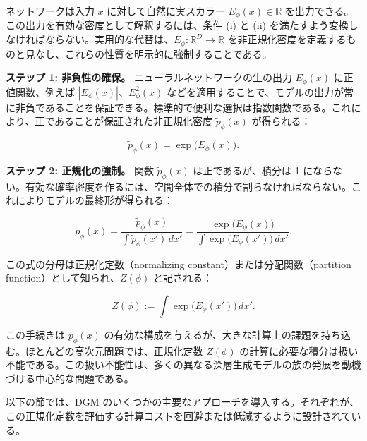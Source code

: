 ネットワークは入力 $x$ に対して自然に実スカラー $E_\phi(x) \in \mathbb{R}$ を出力できる。この出力を有効な密度として解釈するには、条件 (i) と (ii) を満たすよう変換しなければならない。実用的な代替は、$E_\phi : \mathbb{R}^D \to \mathbb{R}$ を非正規化密度を定義するものと見なし、これらの性質を明示的に強制することである。

\textbf{ステップ 1: 非負性の確保。} ニューラルネットワークの生の出力 $E_\phi(x)$ に正値関数、例えば $|E_\phi(x)|$、$E_\phi^2(x)$ などを適用することで、モデルの出力が常に非負であることを保証できる。標準的で便利な選択は指数関数である。これにより、正であることが保証された非正規化密度 $\tilde{p}_\phi(x)$ が得られる：

\[
\tilde{p}_\phi(x) = \exp\bigl(E_\phi(x)\bigr).
\]


\textbf{ステップ 2: 正規化の強制。} 関数 $\tilde{p}_\phi(x)$ は正であるが、積分は 1 にならない。有効な確率密度を作るには、空間全体での積分で割らなければならない。これによりモデルの最終形が得られる：

\[
p_\phi(x)
= \frac{\tilde{p}_\phi(x)}{\int \tilde{p}_\phi(x')\, dx'}
= \frac{\exp\bigl(E_\phi(x)\bigr)}{\int \exp\bigl(E_\phi(x')\bigr)\, dx'}.
\]


この式の分母は正規化定数（normalizing constant）または分配関数（partition function）として知られ、$Z(\phi)$ と記される：

\[
Z(\phi) := \int \exp\bigl(E_\phi(x')\bigr)\, dx'.
\]


この手続きは $p_\phi(x)$ の有効な構成を与えるが、大きな計算上の課題を持ち込む。ほとんどの高次元問題では、正規化定数 $Z(\phi)$ の計算に必要な積分は扱い不能である。この扱い不能性は、多くの異なる深層生成モデルの族の発展を動機づける中心的な問題である。

以下の節では、DGM のいくつかの主要なアプローチを導入する。それぞれが、この正規化定数を評価する計算コストを回避または低減するように設計されている。

